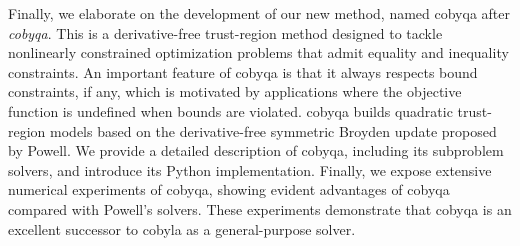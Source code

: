 Finally, we elaborate on the development of our new  method, named \gls{cobyqa} after \textit{\glsdesc{cobyqa}}.
This is a derivative-free trust-region  method designed to tackle nonlinearly constrained optimization problems that admit equality and inequality constraints.
An important feature of \gls{cobyqa} is that it always respects bound constraints, if any, which is motivated by applications where the objective function is undefined when bounds are violated.
\Gls{cobyqa} builds quadratic trust-region models based on the derivative-free symmetric Broyden update proposed by Powell.
We provide a detailed description of \gls{cobyqa}, including its subproblem solvers, and introduce its Python implementation.
Finally, we expose extensive numerical experiments of \gls{cobyqa}, showing evident advantages of \gls{cobyqa} compared with Powell's  solvers.
These experiments demonstrate that \gls{cobyqa} is an excellent successor to \gls{cobyla} as a general-purpose  solver.
